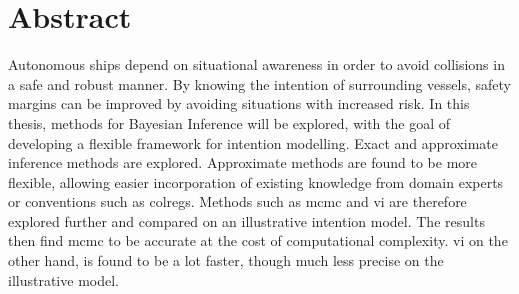 \chapter*{Abstract}

Autonomous ships depend on situational awareness in order to avoid collisions in a safe and robust manner. By knowing the intention of surrounding vessels, safety margins can be improved by avoiding situations with increased risk. In this thesis, methods for Bayesian Inference will be explored, with the goal of developing a flexible framework for intention modelling. Exact and approximate inference methods are explored. Approximate methods are found to be more flexible, allowing easier incorporation of existing knowledge from domain experts or conventions such as \Gls{colregs}. Methods such as \acrfull{mcmc} and \acrfull{vi} are therefore explored further and compared on an illustrative intention model. The results then find \acrshort{mcmc} to be accurate at the cost of computational complexity. \acrshort{vi} on the other hand, is found to be a lot faster, though much less precise on the illustrative model. 
